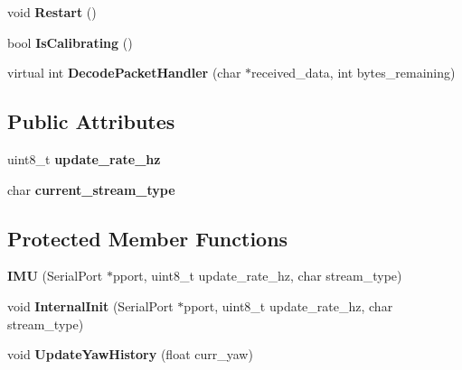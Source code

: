 \begin{DoxyCompactItemize}
\item 
\hypertarget{class_i_m_u_acc57c44ede00d36ece51325dcd2f9b1e}{}void {\bfseries Restart} ()\label{class_i_m_u_acc57c44ede00d36ece51325dcd2f9b1e}

\item 
\hypertarget{class_i_m_u_a487c9c4355277cebe1a3b4bcc05b58d1}{}bool {\bfseries Is\+Calibrating} ()\label{class_i_m_u_a487c9c4355277cebe1a3b4bcc05b58d1}

\item 
\hypertarget{class_i_m_u_ab7cc1a50aa8aafa63662a87086ef5282}{}virtual int {\bfseries Decode\+Packet\+Handler} (char $\ast$received\+\_\+data, int bytes\+\_\+remaining)\label{class_i_m_u_ab7cc1a50aa8aafa63662a87086ef5282}

\end{DoxyCompactItemize}
\subsection*{Public Attributes}
\begin{DoxyCompactItemize}
\item 
\hypertarget{class_i_m_u_a31e9059f2a805339c1ef3fb210276f2d}{}uint8\+\_\+t {\bfseries update\+\_\+rate\+\_\+hz}\label{class_i_m_u_a31e9059f2a805339c1ef3fb210276f2d}

\item 
\hypertarget{class_i_m_u_af8556bf9f3d975571e340656388bbc6c}{}char {\bfseries current\+\_\+stream\+\_\+type}\label{class_i_m_u_af8556bf9f3d975571e340656388bbc6c}

\end{DoxyCompactItemize}
\subsection*{Protected Member Functions}
\begin{DoxyCompactItemize}
\item 
\hypertarget{class_i_m_u_a5768eb5fa968177300dd9e4a16bda86f}{}{\bfseries I\+M\+U} (Serial\+Port $\ast$pport, uint8\+\_\+t update\+\_\+rate\+\_\+hz, char stream\+\_\+type)\label{class_i_m_u_a5768eb5fa968177300dd9e4a16bda86f}

\item 
\hypertarget{class_i_m_u_a8032d6903cf70281086c07ebdfe16b80}{}void {\bfseries Internal\+Init} (Serial\+Port $\ast$pport, uint8\+\_\+t update\+\_\+rate\+\_\+hz, char stream\+\_\+type)\label{class_i_m_u_a8032d6903cf70281086c07ebdfe16b80}

\item 
\hypertarget{class_i_m_u_ad005f8d336dbfc0fd53efdb8c3976fc9}{}void {\bfseries Update\+Yaw\+History} (float curr\+\_\+yaw)\label{class_i_m_u_ad005f8d336dbfc0fd53efdb8c3976fc9}

\end{DoxyCompactItemize}
